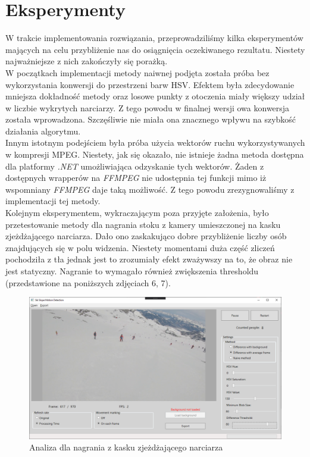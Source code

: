 \documentclass[a4paper]{article}
\begin{document}
\section{Eksperymenty}
W trakcie implementowania rozwiązania, przeprowadziliśmy kilka eksperymentów mających na celu przybliżenie nas do osiągnięcia oczekiwanego rezultatu. Niestety najważniejsze z nich zakończyły się porażką.\\
W początkach implementacji metody naiwnej podjęta została próba bez wykorzystania konwersji do przestrzeni barw HSV.  Efektem była zdecydowanie mniejsza dokładność metody oraz losowe punkty z otoczenia miały większy udział w liczbie wykrytych narciarzy. Z tego powodu w finalnej wersji owa konwersja została wprowadzona. Szczęśliwie nie miała ona znacznego wpływu na szybkość działania algorytmu.\\
Innym istotnym podejściem była próba użycia wektorów ruchu wykorzystywanych w kompresji MPEG. Niestety, jak się okazało, nie istnieje żadna metoda dostępna dla platformy \textit{.NET} umożliwiająca odzyskanie tych wektorów. Żaden z dostępnych wrapperów na \textit{FFMPEG} nie udostępnia tej funkcji mimo iż wspomniany \textit{FFMPEG} daje taką możliwość. Z tego powodu zrezygnowaliśmy z implementacji tej metody. \\
Kolejnym eksperymentem, wykraczającym poza przyjęte założenia, było przetestowanie metody dla nagrania stoku z kamery umieszczonej na kasku zjeżdżającego narciarza. Dało ono zaskakująco dobre przybliżenie liczby osób znajdujących się w polu widzenia. Niestety momentami duża część zliczeń pochodziła z tła jednak jest to zrozumiały efekt zważywszy na to, że obraz nie jest statyczny. Nagranie to wymagało również zwiększenia thresholdu (przedstawione na poniższych zdjęciach 6, 7).
\begin{figure}[H]
  \includegraphics[width=\linewidth]{resources/img6.png}
  \caption{Analiza dla nagrania z kasku zjeżdżającego narciarza}
\end{figure}
\end{document}
